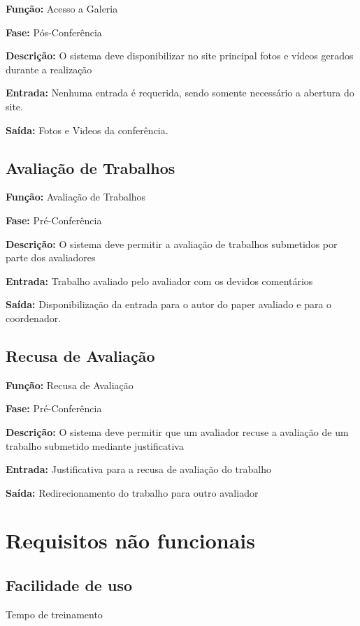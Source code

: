 \documentclass[letter]{article}
\begin{document}
\textbf{Função:} Acesso a Galeria

\textbf{Fase:} Pós-Conferência

\textbf{Descrição:} O sistema deve disponibilizar no site principal fotos e vídeos gerados durante a realização

\textbf{Entrada:} Nenhuma entrada é requerida, sendo somente necessário a abertura do site.

\textbf{Saída:} Fotos e Videos da conferência.



\subsection{ Avaliação de Trabalhos}

\textbf{Função:} Avaliação de Trabalhos

\textbf{Fase:} Pré-Conferência

\textbf{Descrição:} O sistema deve permitir a avaliação de trabalhos submetidos por parte dos avaliadores

\textbf{Entrada:} Trabalho avaliado pelo avaliador com os devidos comentários

\textbf{Saída:} Disponibilização da entrada para o autor do paper avaliado e para o coordenador.


\subsection{ Recusa de Avaliação}

\textbf{Função:} Recusa de Avaliação

\textbf{Fase:} Pré-Conferência

\textbf{Descrição:} O sistema deve permitir que um avaliador recuse a avaliação de um trabalho submetido mediante justificativa

\textbf{Entrada:} Justificativa para a recusa de avaliação do trabalho

\textbf{Saída:} Redirecionamento do trabalho para outro avaliador

\section{Requisitos não funcionais}

\subsection{ Facilidade de uso}
\textbullet Tempo de treinamento
\end{document}
